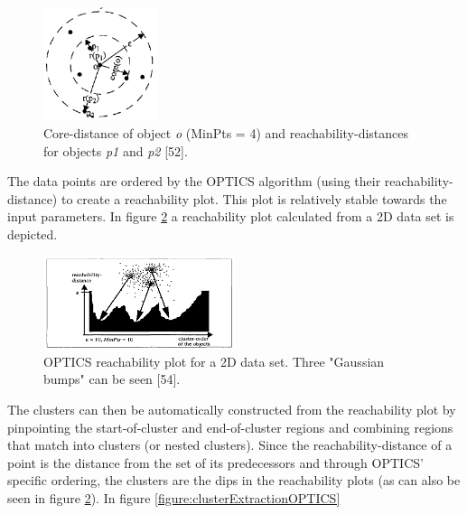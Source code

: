 \begin{figure}[h]
  \centering
  \includegraphics[width=0.3\textwidth]{./images/reachabilityDistanceOPTICS.png}
  \caption{Core-distance of object \textit{o} (MinPts = 4) and reachability-distances for objects \textit{p1} and \textit{p2} \autocite{OPTICS}[52].}
  \label{figure:reachabilityDistanceOPTICS}
\end{figure}


The data points are ordered by the OPTICS algorithm (using their reachability-distance) to create a reachability plot. This plot is relatively stable towards the input parameters. In figure \ref{figure:reachabilityPlotOPTICS} a reachability plot calculated from a 2D data set is depicted. 

\begin{figure}[h]
  \centering
  \includegraphics[width=0.5\textwidth]{./images/reachabilityPlotOPTICS.png}
  \caption{OPTICS reachability plot for a 2D data set. Three "Gaussian bumps" can be seen \autocite{OPTICS}[54].}
  \label{figure:reachabilityPlotOPTICS}
\end{figure}

The clusters can then be automatically constructed from the reachability plot by pinpointing the start-of-cluster and end-of-cluster regions and combining regions that match into clusters (or nested clusters). Since the reachability-distance of a point is the distance from the set of its predecessors and through OPTICS' specific ordering, the clusters are the dips in the reachability plots (as can also be seen in figure \ref{figure:reachabilityPlotOPTICS}). In figure \ref{figure:clusterExtractionOPTICS}


